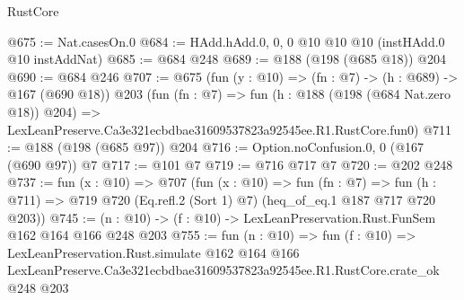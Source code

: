 \begin{lexlean}{RustCore}
\begin{coremodule}
@675 := Nat.casesOn.{0}
@684 := HAdd.hAdd.{0, 0, 0} @10 @10 @10 (instHAdd.{0} @10 instAddNat)
@685 := @684 @248
@689 := @188 (@198 (@685 @18)) @204
@690 := @684 @246
@707 := @675
    (fun (y : @10) => (fn : @7) -> (h : @689) -> @167 (@690 @18))
    @203
    (fun (fn : @7) =>
    fun (h : @188 (@198 (@684 Nat.zero @18)) @204) =>
    LexLeanPreserve.Ca3e321ecbdbae31609537823a92545ee.R1.RustCore.fun0)
@711 := @188 (@198 (@685 @97)) @204
@716 := Option.noConfusion.{0, 0} (@167 (@690 @97)) @7
@717 := @101 @7
@719 := @716 @717 @7
@720 := @202 @248
@737 := fun (x : @10) =>
  @707
    (fun (x : @10) =>
    fun (fn : @7) =>
    fun (h : @711) => @719 @720 (Eq.refl.{2} (Sort 1) @7) (heq_of_eq.{1} @187 @717 @720 @203))
@745 := (n : @10) -> (f : @10) -> LexLeanPreservation.Rust.FunSem @162 @164 @166 @248 @203
@755 := fun (n : @10) =>
  fun (f : @10) =>
  LexLeanPreservation.Rust.simulate
    @162
    @164
    @166
    LexLeanPreserve.Ca3e321ecbdbae31609537823a92545ee.R1.RustCore.crate_ok
    @248
    @203
\end{coremodule}
\end{lexlean}
